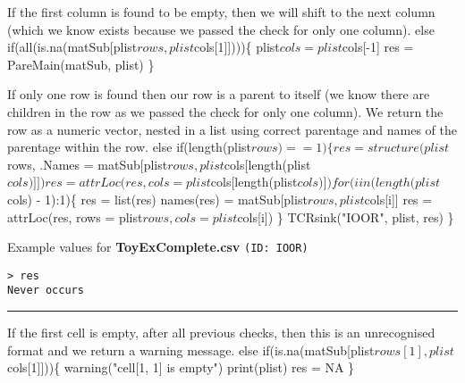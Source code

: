 \documentclass[a4paper]{article}
\begin{document}
If the first column is found to be empty, then we will shift to the
next column (which we know exists because we passed the check for only
one column).
\nwenddocs{}\endmoddef
else if(all(is.na(matSub[plist$rows, plist$cols[1]])))\{
  plist$cols = plist$cols[-1]
  res = PareMain(matSub, plist)
\}
\nwendcode{}\nwdocspar

If only one row is found then our row is a parent to itself (we know
there are children in the row as we passed the check for only one
column). We return the row as a numeric vector, nested in a list using
correct parentage and names of the parentage within the row.
\nwenddocs{}\endmoddef
else if(length(plist$rows) == 1)\{
  res = structure(plist$rows,
    .Names = matSub[plist$rows, plist$cols[length(plist$cols)]])
  res = attrLoc(res, cols = plist$cols[length(plist$cols)])
  for(i in (length(plist$cols) - 1):1)\{
    res = list(res)
    names(res) = matSub[plist$rows, plist$cols[i]]
    res = attrLoc(res, rows = plist$rows, cols = plist$cols[i])
  \}
  TCRsink("IOOR", plist, res)
\}
\nwendcode{}\nwdocspar

Example values for \textbf{ToyExComplete.csv} \texttt{(ID: IOOR)}
\begin{verbatim}
> res
Never occurs
\end{verbatim}
\vspace{-1.5em}
\noindent\rule{0.25\textwidth}{0.4pt}
\vspace{0.5em}

If the first cell is empty, after all previous checks, then this is an
unrecognised format and we return a warning message.
\nwenddocs{}\endmoddef
else if(is.na(matSub[plist$rows[1], plist$cols[1]]))\{
  warning("cell[1, 1] is empty")
  print(plist)
  res = NA
\}
\nwendcode{}\nwdocspar
\end{document}

